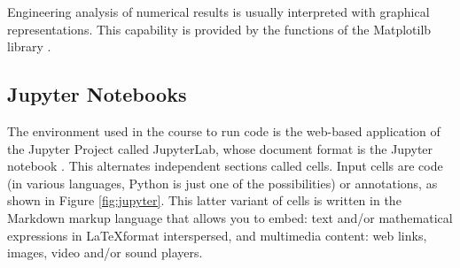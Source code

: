 Engineering analysis of numerical results is usually interpreted with graphical representations. This capability is provided by the functions of the Matplotilb library \cite{matplotlib}.










\subsection{Jupyter Notebooks}
The environment used in the course to run code is the web-based application of the Jupyter Project called JupyterLab, whose document format is the Jupyter notebook \cite{Kluyver2016jupyter}.
This alternates independent sections called cells.
Input cells are code (in various languages, Python is just one of the possibilities) or annotations, as shown in Figure \ref{fig:jupyter}.
This latter variant of cells is written in the Markdown markup language \cite{markdown} that allows you to embed: text and/or mathematical expressions in \LaTeX format interspersed, and multimedia content: web links, images, video and/or sound players.


